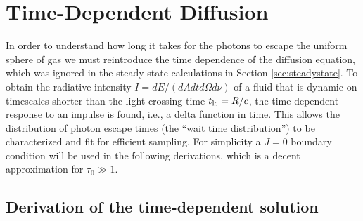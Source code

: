 \documentclass{aastex63}
\begin{document}
\section{Time-Dependent Diffusion}
\label{sec:time_dependent}

In order to understand how long it takes for the photons to escape the uniform sphere of gas we must reintroduce the time dependence of the diffusion equation, which was ignored in the steady-state calculations in Section \ref{sec:steadystate}. To obtain the radiative intensity $I=dE/(dAdtd\Omega d\nu)$ of a fluid that is dynamic on timescales shorter than the light-crossing time $t_{\rm lc} = R/c$, the time-dependent response to an impulse is found, i.e., a delta function in time. This allows the distribution of photon escape times (the ``wait time distribution'') to be characterized and fit for efficient sampling. For simplicity a $J=0$ boundary condition will be used in the following derivations, which is a decent approximation for $\tau_0 \gg 1$. 

\subsection{Derivation of the time-dependent solution}
\label{subsec:time_dependent:background}
\end{document}
